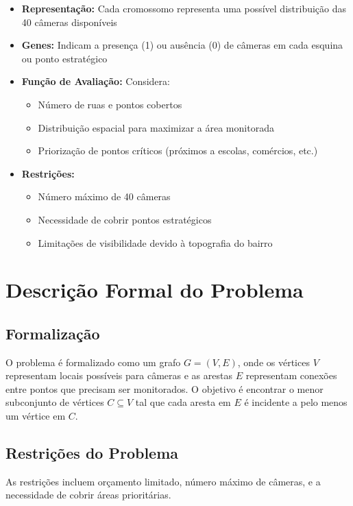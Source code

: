 \documentclass[12pt, a4paper]{report}
\begin{document}
\begin{itemize}
    \item \textbf{Representação:} Cada cromossomo representa uma possível distribuição das 40 câmeras disponíveis
    \item \textbf{Genes:} Indicam a presença (1) ou ausência (0) de câmeras em cada esquina ou ponto estratégico
    \item \textbf{Função de Avaliação:} Considera:
    \begin{itemize}
        \item Número de ruas e pontos cobertos
        \item Distribuição espacial para maximizar a área monitorada
        \item Priorização de pontos críticos (próximos a escolas, comércios, etc.)
    \end{itemize}
    \item \textbf{Restrições:} 
    \begin{itemize}
        \item Número máximo de 40 câmeras
        \item Necessidade de cobrir pontos estratégicos
        \item Limitações de visibilidade devido à topografia do bairro
    \end{itemize}
\end{itemize}

\chapter{Descrição Formal do Problema}

\section{Formalização}
O problema é formalizado como um grafo \(G = (V, E)\), onde os vértices \(V\) representam locais possíveis para câmeras e as arestas \(E\) representam conexões entre pontos que precisam ser monitorados. O objetivo é encontrar o menor subconjunto de vértices \(C \subseteq V\) tal que cada aresta em \(E\) é incidente a pelo menos um vértice em \(C\).

\section{Restrições do Problema}
As restrições incluem orçamento limitado, número máximo de câmeras, e a necessidade de cobrir áreas prioritárias.
\end{document}

